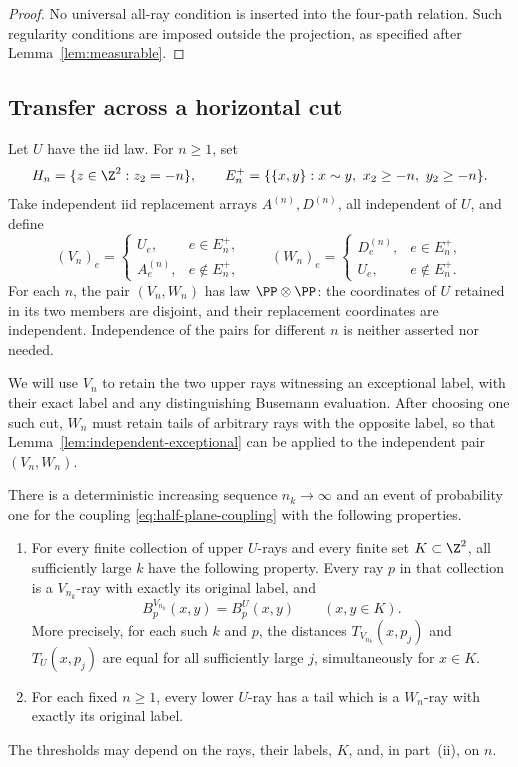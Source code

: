 \begin{proof}
No universal all-ray condition is inserted into the four-path
relation. Such regularity conditions are imposed outside the
projection, as specified after Lemma~\ref{lem:measurable}.
\end{proof}

\subsection{Transfer across a horizontal cut}

Let $U$ have the iid law.  For $n\ge1$, set
\[
 H_n=\{z\in\Z^2:z_2=-n\},\qquad
 E_n^+=\{\{x,y\}:x\sim y,\ x_2\ge-n,\ y_2\ge-n\}.
\]
Take independent iid replacement arrays $A^{(n)},D^{(n)}$, all
independent of $U$, and define
\begin{equation}
 (V_n)_e=
 \begin{cases}U_e,&e\in E_n^+,\\ A^{(n)}_e,&e\notin E_n^+,\end{cases}
 \qquad
 (W_n)_e=
 \begin{cases}D^{(n)}_e,&e\in E_n^+,\\ U_e,&e\notin E_n^+.\end{cases}
 \label{eq:half-plane-coupling}
\end{equation}
For each $n$, the pair $(V_n,W_n)$ has law $\PP\otimes\PP$: the
coordinates of $U$ retained in its two members are disjoint, and
their replacement coordinates are independent.  Independence of
the pairs for different $n$ is neither asserted nor needed.

We will use $V_n$ to retain the two upper rays witnessing an exceptional
label, with their exact label and any distinguishing Busemann evaluation.
After choosing one such cut, $W_n$ must retain tails of arbitrary rays
with the opposite label, so that Lemma~\ref{lem:independent-exceptional}
can be applied to the independent pair $(V_n,W_n)$.

\begin{lemma}
\label{lem:cut-transfer}
There is a deterministic increasing sequence $n_k\to\infty$ and an
event of probability one for the coupling
\eqref{eq:half-plane-coupling} with the following properties.
\begin{enumerate}[label=(\roman*)]
\item For every finite collection of upper $U$-rays and every finite
      set $K\subset\Z^2$, all sufficiently large $k$ have the
      following property.  Every ray $p$ in that collection is a
      $V_{n_k}$-ray with exactly its original label, and
      \[
       B_p^{V_{n_k}}(x,y)=B_p^U(x,y)\qquad(x,y\in K).
      \]
      More precisely, for each such $k$ and $p$, the distances
      $T_{V_{n_k}}(x,p_j)$ and $T_U(x,p_j)$ are equal for all
      sufficiently large $j$, simultaneously for $x\in K$.
\item For each fixed $n\ge1$, every lower $U$-ray has a tail which
      is a $W_n$-ray with exactly its original label.
\end{enumerate}
The thresholds may depend on the rays, their labels, $K$, and, in
part~(ii), on $n$.
\end{lemma}

